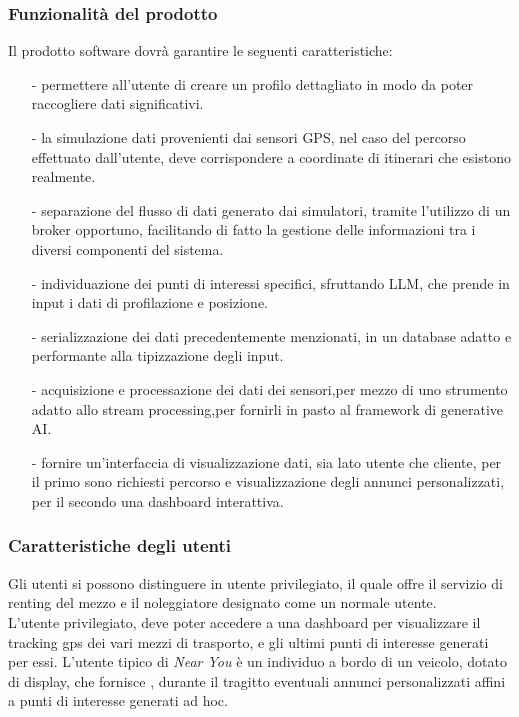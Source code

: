 \documentclass[11pt]{article}
\begin{document}
\begin{justify}
\subsubsection{Funzionalità del prodotto}
Il prodotto software dovrà garantire le seguenti caratteristiche:
\begin{itemize}
    \item [-] permettere all'utente di creare un profilo dettagliato in modo da poter raccogliere dati significativi.
    \item [-] la simulazione dati provenienti dai sensori GPS, nel caso del percorso effettuato dall'utente, deve corrispondere a coordinate di itinerari che esistono realmente.
    \item [-] separazione del flusso di dati generato dai simulatori, tramite l'utilizzo di un broker opportuno, facilitando di fatto la gestione delle informazioni tra i diversi componenti del sistema.
    \item [-] individuazione dei punti di interessi specifici, sfruttando LLM, che prende in input i dati di profilazione e posizione.
    \item [-] serializzazione dei dati precedentemente menzionati, in un database adatto e performante alla tipizzazione degli input.
    \item [-] acquisizione e processazione dei dati dei sensori,per mezzo di uno strumento adatto allo stream processing,per fornirli in pasto al framework di generative AI.
    \item [-] fornire un'interfaccia di visualizzazione dati, sia lato utente che cliente, per il primo sono richiesti percorso e visualizzazione degli annunci personalizzati, per il secondo una dashboard interattiva.
    
\end{itemize}

\subsubsection{Caratteristiche degli utenti}
Gli utenti si possono distinguere in utente privilegiato, il quale offre il servizio di renting del mezzo e il noleggiatore designato come un normale utente.\\
L'utente privilegiato, deve poter accedere a una dashboard per visualizzare il tracking gps dei vari mezzi di trasporto, e gli ultimi punti di interesse generati per essi.
L'utente tipico di \textit{Near You} è un individuo a bordo di un veicolo, dotato di display, che fornisce , durante il tragitto eventuali annunci personalizzati affini a punti di interesse generati ad hoc.

\end{justify}
\end{document}
